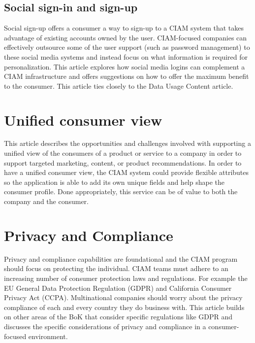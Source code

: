 \hypertarget{social-sign-in-and-sign-up}{%
\subsection{Social sign-in and
sign-up}\label{social-sign-in-and-sign-up}}

Social sign-up offers a consumer a way to sign-up to a CIAM system that
takes advantage of existing accounts owned by the user. CIAM-focused
companies can effectively outsource some of the user support (such as
password management) to these social media systems and instead focus on
what information is required for personalization. This article explores
how social media logins can complement a CIAM infrastructure and offers
suggestions on how to offer the maximum benefit to the consumer. This
article ties closely to the Data Usage Content article.

\hypertarget{unified-consumer-view}{%
\section{Unified consumer view}\label{unified-consumer-view}}

This article describes the opportunities and challenges involved with
supporting a unified view of the consumers of a product or service to a
company in order to support targeted marketing, content, or product
recommendations. In order to have a unified consumer view, the CIAM
system could provide flexible attributes so the application is able to
add its own unique fields and help shape the consumer profile. Done
appropriately, this service can be of value to both the company and the
consumer.

\hypertarget{privacy-and-compliance}{%
\section{Privacy and Compliance}\label{privacy-and-compliance}}

Privacy and compliance capabilities are foundational and the CIAM
program should focus on protecting the individual. CIAM teams must
adhere to an increasing number of consumer protection laws and
regulations. For example the EU General Data Protection Regulation
(GDPR) and California Consumer Privacy Act (CCPA). Multinational
companies should worry about the privacy compliance of each and every
country they do business with. This article builds on other areas of the
BoK that consider specific regulations like GDPR and discusses the
specific considerations of privacy and compliance in a consumer-focused
environment.

